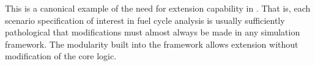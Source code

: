 This is a canonical example of the need for extension
capability in \Cyclus. That is, each scenario specification of interest in fuel
cycle analysis is usually sufficiently pathological that modifications must
almost always be made in any simulation framework. The modularity built into
the \Cyclus framework allows extension without modification of the core logic.  

